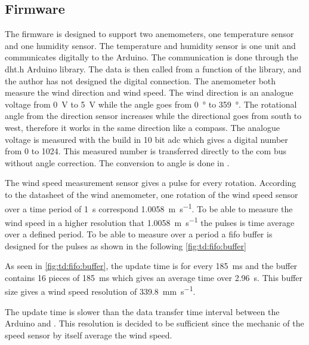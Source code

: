 \subsection{Firmware}
The firmware is designed to support two anemometers, one temperature sensor and one humidity sensor.
The temperature and humidity sensor is one unit and communicates digitally to the Arduino. The communication is done through the dht.h Arduino library. The data is then called from a function of the library, and the author has not designed the digital connection. 
The anemometer both measure the wind direction and wind speed. The wind direction is an analogue voltage from \SI{0}{\volt} to \SI{5}{\volt} while the angle goes from \SI{0}{\degree} to \SI{359}{\degree}. The rotational angle from the direction sensor increases while the directional goes from south to west, therefore it works in the same direction like a compass. The analogue voltage is measured with the build in 10 bit \gls{adc} which gives a digital number from 0 to 1024. This measured number is transferred directly to the com bus without angle correction. The conversion to angle is done in \matlab . 

The wind speed measurement sensor gives a pulse for every rotation. According to the datasheet of the wind anemometer, one rotation of the wind speed sensor over a time period of \SI{1}{\second} correspond \SI{1.0058}{\meter\per\second}. To be able to measure the wind speed in a higher resolution that \SI{1.0058}{\meter\per\second} the pulses is time average over a defined period. To be able to measure over a period a \gls{fifo} buffer is designed for the pulses as shown in the following \autoref{fig:td:fifo:buffer} 

As seen in \autoref{fig:td:fifo:buffer}, the update time is for every \SI{185}{\milli\second} and the buffer contains 16 pieces of \SI{185}{\milli\second} which gives an average time over \SI{2.96}{\second}. This buffer size gives a wind speed resolution of \SI{339.8}{\milli\meter\per\second}. 

The update time is slower than the data transfer time interval between the Arduino and \matlab.  This resolution is decided to be sufficient since the mechanic of the speed sensor by itself average the wind speed.

